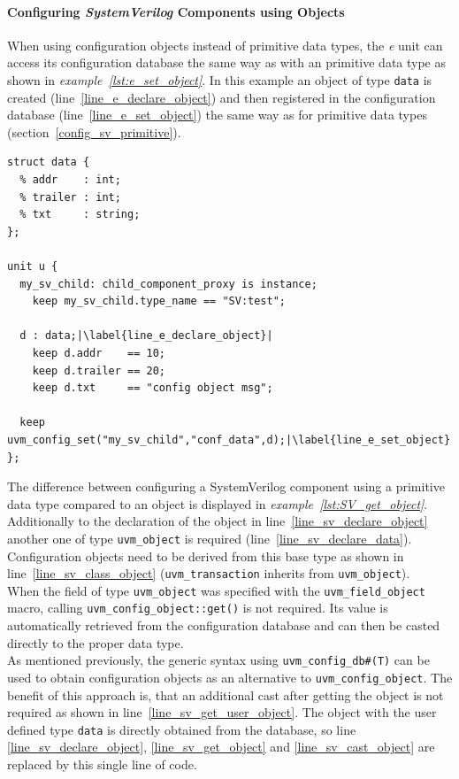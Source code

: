 \paragraph{Configuring \emph{SystemVerilog} Components using Objects}\label{e_config_sv_object}

When using configuration objects instead of primitive data types, the \textit{e} unit can access its configuration
database the same way as with an primitive data type as shown in \emph{example~\ref{lst:e_set_object}}. In this example
an object of type \lstinline$data$ is created (line~\ref{line_e_declare_object}) and then registered in the
configuration database (line~\ref{line_e_set_object}) the same way as for primitive data types
(section~\ref{config_sv_primitive}).

\lstset{language=e, numbers = left, escapechar=|, breaklines=true}
\begin{lstlisting}[frame=htrbl, caption={e: register an object in configuration database}, label={lst:e_set_object}]
struct data {
  % addr    : int;
  % trailer : int;
  % txt     : string;
};

unit u {
  my_sv_child: child_component_proxy is instance;
    keep my_sv_child.type_name == "SV:test";
  
  d : data;|\label{line_e_declare_object}|
    keep d.addr    == 10;
    keep d.trailer == 20;
    keep d.txt     == "config object msg";

  keep uvm_config_set("my_sv_child","conf_data",d);|\label{line_e_set_object}|
};
\end{lstlisting}
The difference between configuring a SystemVerilog component using a primitive data type compared to an object
is displayed in \emph{example~\ref{lst:SV_get_object}}. Additionally to the declaration of the object in
line~\ref{line_sv_declare_object} another one of type \lstinline$uvm_object$ is required
(line~\ref{line_sv_declare_data}). Configuration objects need to be derived from this base type as shown in
line~\ref{line_sv_class_object} (\lstinline$uvm_transaction$ inherits from \lstinline$uvm_object$).\\
When the field of type \lstinline$uvm_object$ was specified with the \lstinline$uvm_field_object$ macro, calling
\lstinline$uvm_config_object::get()$ is not required. Its value is automatically retrieved from the configuration
database and can then be casted directly to the proper data type.\\
As mentioned previously, the generic syntax using \lstinline$uvm_config_db#(T)$ can be used to obtain configuration
objects as an alternative to \lstinline$uvm_config_object$.
The benefit of this approach is, that an additional cast after getting the object is not required as shown in
line~\ref{line_sv_get_user_object}. The object with the user defined type \lstinline$data$ is directly obtained from
the database, so line \ref{line_sv_declare_object}, \ref{line_sv_get_object} and \ref{line_sv_cast_object} are replaced
by this single line of code.

